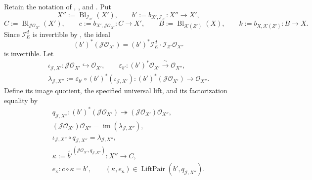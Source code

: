 \begin{definition}
  \label{def:nagata-composition-of-blowups-comparison}
  \lean{}

  Retain the notation of
  ,
  , and
  .  Put
  \[
    X'':=\operatorname{Bl}_{\mathcal I_{Z'}}(X'),\qquad
    b':=b_{X',\mathcal I_{Z'}}\colon X''\to X',
  \]
  \[
    C:=\operatorname{Bl}_{\mathcal J\mathcal O_{X'}}(X'),\qquad
    c:=b_{X',\mathcal J\mathcal O_{X'}}\colon C\to X',
    \qquad
    B:=\operatorname{Bl}_{\mathcal K(Z')}(X),\qquad
    k:=b_{X,\mathcal K(Z')}\colon B\to X.
  \]
  Since $\mathcal I_E^d$ is invertible by
  , the ideal
  \[
    (b')^*(\mathcal J\mathcal O_{X'})
      = (b')^*\mathcal I_E^d\cdot
        \mathcal I_{Z'}\mathcal O_{X''}
  \]
  is invertible.  Let
  \[
  \begin{gathered}
    \iota_{\mathcal J,X'}\colon
      \mathcal J\mathcal O_{X'}\hookrightarrow\mathcal O_{X'},\qquad
    \varepsilon_{b'}\colon(b')^*\mathcal O_{X'}
      \xrightarrow{\ \sim\ }\mathcal O_{X''},\\
    \lambda_{\mathcal J,X''}:=
      \varepsilon_{b'}\circ(b')^*(\iota_{\mathcal J,X'})
      \colon(b')^*(\mathcal J\mathcal O_{X'})
        \longrightarrow\mathcal O_{X''}.
  \end{gathered}                                               \tag{CBa}
  \]
  Define its image quotient, the specified universal lift,
  and its factorization equality by
  \[
  \begin{gathered}
    q_{\mathcal J,X''}\colon
      (b')^*(\mathcal J\mathcal O_{X'})
        \twoheadrightarrow
        (\mathcal J\mathcal O_{X'})\mathcal O_{X''},\\
    (\mathcal J\mathcal O_{X'})\mathcal O_{X''}
      =\operatorname{im}(\lambda_{\mathcal J,X''}),\\
    \iota_{\mathcal J,X''}\circ q_{\mathcal J,X''}
      =\lambda_{\mathcal J,X''},\\
    \kappa:=
      \widetilde{b'}^{
        (\mathcal J\mathcal O_{X'},q_{\mathcal J,X''})}
      \colon X''\longrightarrow C,\\
    e_\kappa\colon c\circ\kappa=b',\qquad
    (\kappa,e_\kappa)\in
      \operatorname{LiftPair}(b',q_{\mathcal J,X''}).

\end{gathered}\]
\end{definition}
